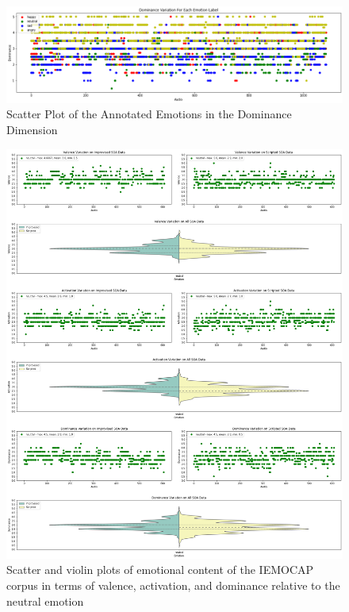 \begin{figure}[H]
	\centering
	\includegraphics[width=1\linewidth]{figs/appendix/IEMOCAP_data_study/dominanceScatterAllEmotions.png}
	\caption{Scatter Plot of the Annotated Emotions in the Dominance Dimension}
	\label{fig:dominanceScatter}
\end{figure}


\begin{figure}[H]
	\centering
	\includegraphics[width=1\linewidth]{figs/appendix/IEMOCAP_data_study/neutralScatterViolins.png}
	\caption{Scatter and violin plots of emotional content of the IEMOCAP corpus in terms of valence, activation, and dominance relative to the neutral emotion}
	\label{fig:neutralScatterViolins}
\end{figure}


